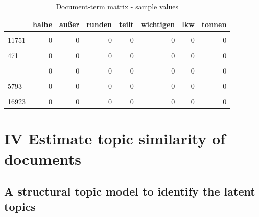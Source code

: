 \documentclass[
]{article}
\begin{document}
\begin{table}[H]

\caption{\label{tab:Document term matrix}Document-term matrix - sample values \label{table:dtm}}
\centering
\fontsize{7}{9}\selectfont
\begin{tabular}[t]{lrrrrrrr}
\toprule
  & halbe & außer & runden & teilt & wichtigen & lkw & tonnen\\
\midrule
\cellcolor{gray!6}{5590} & \cellcolor{gray!6}{0} & \cellcolor{gray!6}{0} & \cellcolor{gray!6}{0} & \cellcolor{gray!6}{0} & \cellcolor{gray!6}{0} & \cellcolor{gray!6}{0} & \cellcolor{gray!6}{0}\\
11751 & 0 & 0 & 0 & 0 & 0 & 0 & 0\\
\cellcolor{gray!6}{4541} & \cellcolor{gray!6}{0} & \cellcolor{gray!6}{0} & \cellcolor{gray!6}{0} & \cellcolor{gray!6}{0} & \cellcolor{gray!6}{0} & \cellcolor{gray!6}{0} & \cellcolor{gray!6}{0}\\
471 & 0 & 0 & 0 & 0 & 0 & 0 & 0\\
\cellcolor{gray!6}{12936} & \cellcolor{gray!6}{0} & \cellcolor{gray!6}{0} & \cellcolor{gray!6}{0} & \cellcolor{gray!6}{0} & \cellcolor{gray!6}{0} & \cellcolor{gray!6}{0} & \cellcolor{gray!6}{0}\\
\addlinespace
6100 & 0 & 0 & 0 & 0 & 0 & 0 & 0\\
\cellcolor{gray!6}{461} & \cellcolor{gray!6}{0} & \cellcolor{gray!6}{0} & \cellcolor{gray!6}{0} & \cellcolor{gray!6}{0} & \cellcolor{gray!6}{0} & \cellcolor{gray!6}{0} & \cellcolor{gray!6}{0}\\
5793 & 0 & 0 & 0 & 0 & 0 & 0 & 0\\
\cellcolor{gray!6}{12510} & \cellcolor{gray!6}{0} & \cellcolor{gray!6}{0} & \cellcolor{gray!6}{0} & \cellcolor{gray!6}{0} & \cellcolor{gray!6}{0} & \cellcolor{gray!6}{0} & \cellcolor{gray!6}{0}\\
16923 & 0 & 0 & 0 & 0 & 0 & 0 & 0\\
\bottomrule
\end{tabular}
\end{table}

\hypertarget{iv-estimate-topic-similarity-of-documents}{%
\section{IV Estimate topic similarity of
documents}\label{iv-estimate-topic-similarity-of-documents}}

\hypertarget{a-structural-topic-model-to-identify-the-latent-topics}{%
\subsection{A structural topic model to identify the latent
topics}\label{a-structural-topic-model-to-identify-the-latent-topics}}
\end{document}
